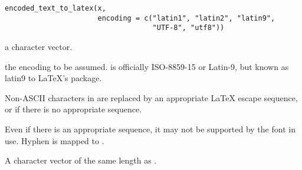 %
\begin{Usage}
\begin{verbatim}
encoded_text_to_latex(x,
                      encoding = c("latin1", "latin2", "latin9",
                                   "UTF-8", "utf8"))
\end{verbatim}
\end{Usage}
%
\begin{Arguments}
\begin{ldescription}
\item[\code{x}] a character vector.
\item[\code{encoding}] the encoding to be assumed.   is
officially ISO-8859-15 or Latin-9, but known as latin9 to LaTeX's
 package.
\end{ldescription}
\end{Arguments}
%
\begin{Details}\relax
Non-ASCII characters in  are replaced by an appropriate LaTeX
escape sequence, or  if there is no appropriate sequence.

Even if there is an appropriate sequence, it may not be supported by
the font in use.  Hyphen is mapped to \samp{\bsl{}-}.
\end{Details}
%
\begin{Value}
A character vector of the same length as .
\end{Value}
%
\begin{SeeAlso}\relax
{}
\end{SeeAlso}
%
